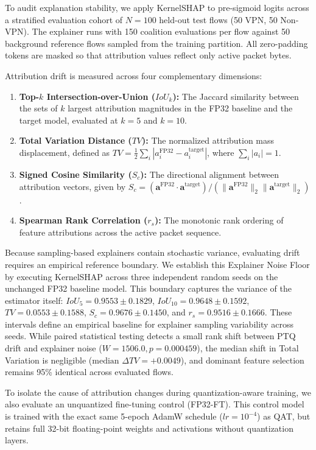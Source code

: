 \documentclass[conference]{IEEEtran}
\begin{document}
To audit explanation stability, we apply KernelSHAP to pre-sigmoid logits across a stratified evaluation cohort of $N = 100$ held-out test flows (50 VPN, 50 Non-VPN). The explainer runs with 150 coalition evaluations per flow against 50 background reference flows sampled from the training partition. All zero-padding tokens are masked so that attribution values reflect only active packet bytes. 

Attribution drift is measured across four complementary dimensions:
\begin{enumerate}
    \item \textbf{Top-$k$ Intersection-over-Union ($IoU_k$):} The Jaccard similarity between the sets of $k$ largest attribution magnitudes in the FP32 baseline and the target model, evaluated at $k = 5$ and $k = 10$.
    \item \textbf{Total Variation Distance ($TV$):} The normalized attribution mass displacement, defined as $TV = \frac{1}{2} \sum_{i} |a_i^{\text{FP32}} - a_i^{\text{target}}|$, where $\sum_i |a_i| = 1$.
    \item \textbf{Signed Cosine Similarity ($S_c$):} The directional alignment between attribution vectors, given by $S_c = (\mathbf{a}^{\text{FP32}} \cdot \mathbf{a}^{\text{target}}) / (\|\mathbf{a}^{\text{FP32}}\|_2 \|\mathbf{a}^{\text{target}}\|_2)$.
    \item \textbf{Spearman Rank Correlation ($r_s$):} The monotonic rank ordering of feature attributions across the active packet sequence.
\end{enumerate}

Because sampling-based explainers contain stochastic variance, evaluating drift requires an empirical reference boundary. We establish this Explainer Noise Floor by executing KernelSHAP across three independent random seeds on the unchanged FP32 baseline model. This boundary captures the variance of the estimator itself: $IoU_5 = 0.9553 \pm 0.1829$, $IoU_{10} = 0.9648 \pm 0.1592$, $TV = 0.0553 \pm 0.1588$, $S_c = 0.9676 \pm 0.1450$, and $r_s = 0.9516 \pm 0.1666$. These intervals define an empirical baseline for explainer sampling variability across seeds. While paired statistical testing detects a small rank shift between PTQ drift and explainer noise ($W = 1506.0, p = 0.000459$), the median shift in Total Variation is negligible ($\text{median } \Delta TV = +0.0049$), and dominant feature selection remains 95\% identical across evaluated flows.

To isolate the cause of attribution changes during quantization-aware training, we also evaluate an unquantized fine-tuning control (FP32-FT). This control model is trained with the exact same 5-epoch AdamW schedule ($lr = 10^{-4}$) as QAT, but retains full 32-bit floating-point weights and activations without quantization layers.
\end{document}
